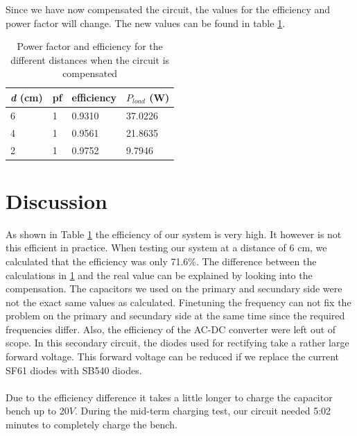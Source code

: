 \documentclass[final]{scrreprt} %
\begin{document}
Since we have now compensated the circuit, the values for the efficiency and power factor will change. 
The new values can be found in table \ref{table3}. \\

\begin{table}[h]
\begin{center}
\begin{tabular}{ l | l | l | l }
    
    \textit{d} (cm)            & pf              & efficiency  &  $P_{load}$ (W)\\	\hline
    6                           & 1                     & 0.9310                & 37.0226  \\
    4                           &1                  & 0.9561                     & 21.8635\\
    2                           & 1                   & 0.9752                    &  9.7946 \\
\end{tabular}
\caption{Power factor and efficiency for the different distances when the circuit is compensated}
\label{table3}
\end{center}
\end{table}


\section*{Discussion}

As shown in Table \ref{table3} the efficiency of our system is very high. 
It however is not this efficient in practice.
When testing our system at a distance of 6 cm, we calculated that the efficiency was only 71.6\%.
The difference between the calculations in \ref{table3} and the real value can be explained by looking into the compensation. 
The capacitors we used on the primary and secundary side were not the exact same values as calculated.
Finetuning the frequency can not fix the problem on the primary and secundary side at the same time since the required frequencies differ. 
Also, the efficiency of the AC-DC converter were left out of scope.
In this secondary circuit, the diodes used for rectifying take a rather large forward voltage.
This forward voltage can be reduced if we replace the current SF61 diodes with SB540 diodes.
\\ \\
Due to the efficiency difference it takes a little longer to charge the capacitor bench up to 20$V$.
During the mid-term charging test, our circuit needed 5:02 minutes to completely charge the bench.
\end{document}
